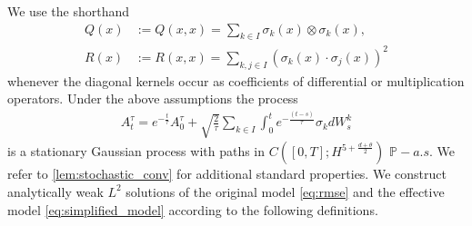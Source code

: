 \documentclass[a4paper,10pt]{amsart}
\newcommand{\R}{\mathbb{R}}
\newtheorem{definition}[theorem]{Definition}
\theoremstyle{remark}
\numberwithin{equation}{section}
\begin{document}
We use the shorthand
\begin{align*}
    Q(x)&:=Q(x,x)=\sum_{k\in I}\sigma_k(x)\otimes\sigma_k(x),\\
    R(x)&:=R(x,x)=\sum_{k,j\in I}(\sigma_k(x)\cdot\sigma_j(x))^2
\end{align*}
whenever the diagonal kernels occur as coefficients of differential or
multiplication operators.
Under the above assumptions the process
\begin{align}\label{eq:OU_prel}
       A^{\tau}_t=e^{-\frac{t}{\tau}}A^{\tau}_0+\sqrt{\frac{2}{{\tau}}}\sum_{k\in I}\int_{0}^t e^{-\frac{(t-s)}{\tau}}\sigma_k dW^k_s
   \end{align}
   is a stationary Gaussian process with paths in
   $C([0,T];H^{5+\frac{d+\theta}{2}})$ $\mathbb{P}-a.s.$ We refer to
   \cref{lem:stochastic_conv} for additional standard properties.
   We construct analytically weak $L^2$ solutions of the original model
   \eqref{eq:rmse} and the effective model \eqref{eq:simplified_model}
   according to the following definitions.
\end{document}
